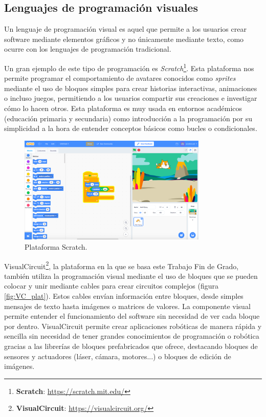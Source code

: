 \subsection{Lenguajes de programación visuales}
\label{subsec:vis_prog}

Un lenguaje de programación visual es aquel que permite a los usuarios crear software mediante elementos gráficos y no únicamente mediante texto,
como ocurre con los lenguajes de programación tradicional.

Un gran ejemplo de este tipo de programación es \textit{Scratch}\footnote{\textbf{Scratch}: \url{https://scratch.mit.edu/}}.
Esta plataforma nos permite programar el comportamiento de avatares conocidos como \textit{sprites} mediante el uso de bloques simples para crear
historias interactivas, animaciones o incluso juegos, permitiendo a los usuarios compartir sus creaciones e investigar cómo lo hacen otros.
Esta plataforma es muy usada en entornos académicos (educación primaria y secundaria) como introducción a la programación por su simplicidad
a la hora de entender conceptos básicos como bucles o condicionales. 

\begin{figure} [H]
  \begin{center}
    \includegraphics[width=9cm]{figs/c1/scratch.png}
  \end{center}
  \caption[Scratch]{Plataforma Scratch.}
  \label{fig:scratch}
\end{figure}

VisualCircuit\footnote{\textbf{VisualCircuit}: \url{https://visualcircuit.org/}}, la plataforma en la que se basa este Trabajo Fin de Grado, también utiliza la programación visual mediante el uso de bloques que se
pueden colocar y unir mediante cables para crear circuitos complejos (figura \ref{fig:VC_plat}).
Estos cables envían información entre bloques, desde simples mensajes de texto hasta imágenes o matrices de valores.
La componente visual permite entender el funcionamiento del software sin necesidad de ver cada bloque por dentro.
VisualCircuit permite crear aplicaciones robóticas de manera rápida y sencilla sin necesidad de tener grandes conocimientos de programación
o robótica gracias a las librerías de bloques prefabricados que ofrece, destacando bloques de sensores y actuadores (láser, cámara, motores...) o bloques
de edición de imágenes.

